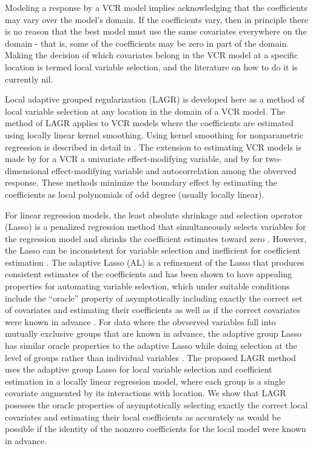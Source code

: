\documentclass[authoryear,review, 12pt]{elsarticle}
\begin{document}
Modeling a response by a VCR model implies acknowledging that the
coefficients may vary over the model's domain. If the coefficients
vary, then in principle there is no reason that the best model must
use the same covariates everywhere on the domain - that is, some of
the coefficients may be zero in part of the domain. Making the decision
of which covariates belong in the VCR model at a specific location
is termed local variable selection, and the literature on how to do
it is currently nil.

Local adaptive grouped regularization (LAGR) is developed here as
a method of local variable selection at any location in the domain
of a VCR model. The method of LAGR applies to VCR models where the
coefficients are estimated using locally linear kernel smoothing.
Using kernel smoothing for nonparametric regression is described in
detail in \citet*{Fan-Gijbels-1996}. The extension to estimating
VCR models is made by \citet{Fan-Zhang-1999} for a VCR a univariate
effect-modifying variable, and by \citet{Sun-Yan-Zhang-Lu-2014} for
two-dimensional effect-modifying variable and autocorrelation among
the obverved response. These methods minimize the boundary effect
\citep{Hastie:1993b} by estimating the coefficients as local polynomials
of odd degree (usually locally linear).

For linear regression models, the least absolute shrinkage and selection
operator (Lasso) is a penalized regression method that simultaneously
selects variables for the regression model and shrinks the coefficient
estimates toward zero \citep{Tibshirani-1996}. However, the Lasso
can be inconsistent for variable selection and inefficient for coefficient
estimation \citep{Zou-2006}. The adaptive Lasso (AL) is a refinement
of the Lasso that produces consistent estimates of the coefficients
and has been shown to have appealing properties for automating variable
selection, which under suitable conditions include the ``oracle''
property of asymptotically including exactly the correct set of covariates
and estimating their coefficients as well as if the correct covariates
were known in advance \citep{Zou-2006}. For data where the obvserved
variables fall into mutually exclusive groups that are known in advance,
the adaptive group Lasso has similar oracle properties to the adaptive
Lasso while doing selection at the level of groups rather than individual
variables \citep{Yuan-Lin-2006,Wang-Leng-2008}. The proposed LAGR
method uses the adaptive group Lasso for local variable selection
and coefficient estimation in a locally linear regression model, where
each group is a single covariate augmented by its interactions with
location. We show that LAGR posesses the oracle properties of asymptotically
selecting exactly the correct local covariates and estimating their
local coefficients as accurately as would be possible if the identity
of the nonzero coefficients for the local model were known in advance.
\end{document}
